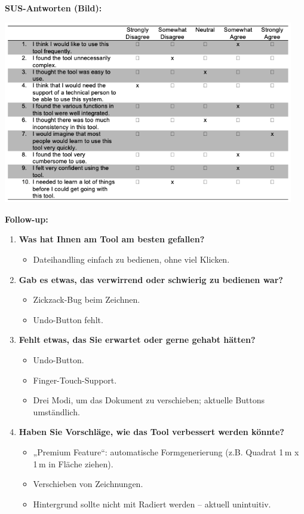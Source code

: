 \clearpage

\textbf{SUS-Antworten (Bild):}
\begin{center}
    \includegraphics[width=0.95\textwidth]{graphics/sus_person4.png}
\end{center}

\textbf{Follow-up:}  
\begin{enumerate}
    \item \textbf{Was hat Ihnen am Tool am besten gefallen?}
    \begin{itemize}
        \item Dateihandling einfach zu bedienen, ohne viel Klicken.
    \end{itemize}

    \item \textbf{Gab es etwas, das verwirrend oder schwierig zu bedienen war?}
    \begin{itemize}
        \item Zickzack-Bug beim Zeichnen.
        \item Undo-Button fehlt.
    \end{itemize}

    \item \textbf{Fehlt etwas, das Sie erwartet oder gerne gehabt hätten?}
    \begin{itemize}
        \item Undo-Button.
        \item Finger-Touch-Support.
        \item Drei Modi, um das Dokument zu verschieben; aktuelle Buttons umständlich.
    \end{itemize}

    \item \textbf{Haben Sie Vorschläge, wie das Tool verbessert werden könnte?}
    \begin{itemize}
        \item „Premium Feature“: automatische Formgenerierung (z.B. Quadrat 1\,m x 1\,m in Fläche ziehen).
        \item Verschieben von Zeichnungen.
        \item Hintergrund sollte nicht mit Radiert werden – aktuell unintuitiv.
    \end{itemize}
\end{enumerate}

\clearpage
